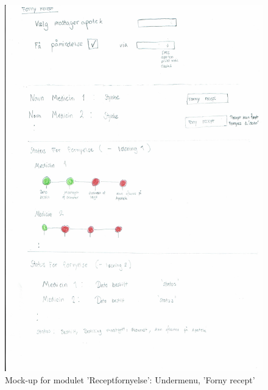  \begin{figure}[H]
 	\centering
 	\includegraphics[angle=0, height=0.85\textheight]{Materials/FornyRecept.pdf}
 	\caption{Mock-up for modulet 'Receptfornyelse': Undermenu, 'Forny recept'}
 	\label{fig:Mock-Up}
 \end{figure}
